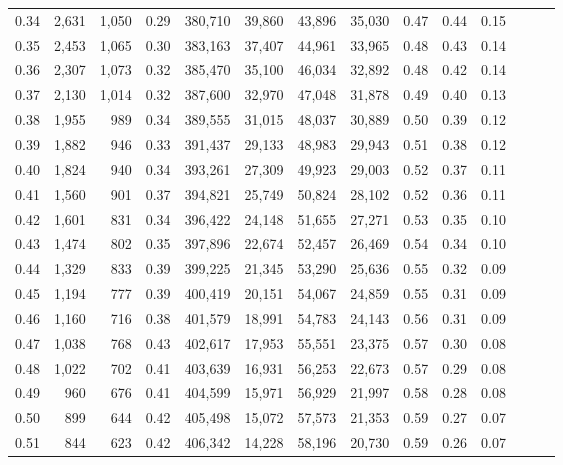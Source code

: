 \begin{tabular}{rrrrrrrrrrrrrr}
0.34 &   2,631 &  1,050 &  0.29 &  380,710 &   39,860 &  43,896 &  35,030 &  0.47 &  0.44 &      0.15 \\
0.35 &   2,453 &  1,065 &  0.30 &  383,163 &   37,407 &  44,961 &  33,965 &  0.48 &  0.43 &      0.14 \\
0.36 &   2,307 &  1,073 &  0.32 &  385,470 &   35,100 &  46,034 &  32,892 &  0.48 &  0.42 &      0.14 \\
0.37 &   2,130 &  1,014 &  0.32 &  387,600 &   32,970 &  47,048 &  31,878 &  0.49 &  0.40 &      0.13 \\
0.38 &   1,955 &    989 &  0.34 &  389,555 &   31,015 &  48,037 &  30,889 &  0.50 &  0.39 &      0.12 \\
0.39 &   1,882 &    946 &  0.33 &  391,437 &   29,133 &  48,983 &  29,943 &  0.51 &  0.38 &      0.12 \\
0.40 &   1,824 &    940 &  0.34 &  393,261 &   27,309 &  49,923 &  29,003 &  0.52 &  0.37 &      0.11 \\
0.41 &   1,560 &    901 &  0.37 &  394,821 &   25,749 &  50,824 &  28,102 &  0.52 &  0.36 &      0.11 \\
0.42 &   1,601 &    831 &  0.34 &  396,422 &   24,148 &  51,655 &  27,271 &  0.53 &  0.35 &      0.10 \\
0.43 &   1,474 &    802 &  0.35 &  397,896 &   22,674 &  52,457 &  26,469 &  0.54 &  0.34 &      0.10 \\
0.44 &   1,329 &    833 &  0.39 &  399,225 &   21,345 &  53,290 &  25,636 &  0.55 &  0.32 &      0.09 \\
0.45 &   1,194 &    777 &  0.39 &  400,419 &   20,151 &  54,067 &  24,859 &  0.55 &  0.31 &      0.09 \\
0.46 &   1,160 &    716 &  0.38 &  401,579 &   18,991 &  54,783 &  24,143 &  0.56 &  0.31 &      0.09 \\
0.47 &   1,038 &    768 &  0.43 &  402,617 &   17,953 &  55,551 &  23,375 &  0.57 &  0.30 &      0.08 \\
0.48 &   1,022 &    702 &  0.41 &  403,639 &   16,931 &  56,253 &  22,673 &  0.57 &  0.29 &      0.08 \\
0.49 &     960 &    676 &  0.41 &  404,599 &   15,971 &  56,929 &  21,997 &  0.58 &  0.28 &      0.08 \\
0.50 &     899 &    644 &  0.42 &  405,498 &   15,072 &  57,573 &  21,353 &  0.59 &  0.27 &      0.07 \\
0.51 &     844 &    623 &  0.42 &  406,342 &   14,228 &  58,196 &  20,730 &  0.59 &  0.26 &      0.07 \\

\end{tabular}
